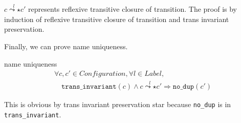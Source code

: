 $c \overset{l}{\leadsto\star} c'$ represents reflexive transitive closure of transition.
The proof is by induction of reflexive transitive closure of transition and trans invariant preservation.

Finally, we can prove name uniqueness.
\begin{theorem}{name uniqueness}
  \begin{displaymath}
    \begin{array}{l}
      \forall c, c' \in \textit{Configuration}, \forall l \in \textit{Label}, \\
      \quad \texttt{trans\_invariant}(c) \wedge c \overset{l}{\leadsto\star} c' \Rightarrow \texttt{no\_dup}(c')
    \end{array}
  \end{displaymath}
\end{theorem}
This is obvious by trans invariant preservation star because \texttt{no\_dup} is in \texttt{trans\_invariant}.
